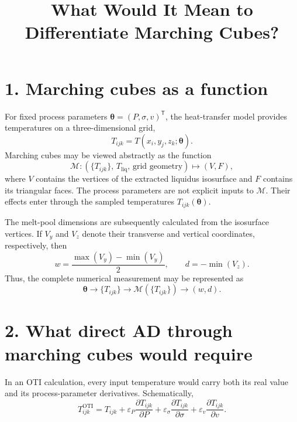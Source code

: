 \documentclass[12pt]{article}
\title{What Would It Mean to Differentiate Marching Cubes?}
\author{}
\date{}
\begin{document}
\maketitle

\section*{1. Marching cubes as a function}

For fixed process parameters
$\boldsymbol{\theta}=(P,\sigma,v)^{\mathsf T}$, the heat-transfer model
provides temperatures on a three-dimensional grid,
\begin{equation}
  T_{ijk}=T(x_i,y_j,z_k;\boldsymbol{\theta}).
\end{equation}
Marching cubes may be viewed abstractly as the function
\begin{equation}
  \mathcal M:
  \left(
    \{T_{ijk}\},\,T_{\mathrm{liq}},\,\text{grid geometry}
  \right)
  \longmapsto
  (V,F),
  \label{eq:marching-cubes-map}
\end{equation}
where $V$ contains the vertices of the extracted liquidus isosurface and
$F$ contains its triangular faces. The process parameters are not explicit
inputs to $\mathcal M$. Their effects enter through the sampled temperatures
$T_{ijk}(\boldsymbol{\theta})$.

The melt-pool dimensions are subsequently calculated from the isosurface
vertices. If $V_y$ and $V_z$ denote their transverse and vertical
coordinates, respectively, then
\begin{equation}
  w=\frac{\max(V_y)-\min(V_y)}{2},
  \qquad
  d=-\min(V_z).
  \label{eq:mesh-dimensions}
\end{equation}
Thus, the complete numerical measurement may be represented as
\begin{equation}
  \boldsymbol{\theta}
  \longrightarrow
  \{T_{ijk}\}
  \longrightarrow
  \mathcal M(\{T_{ijk}\})
  \longrightarrow
  (w,d).
  \label{eq:measurement-chain}
\end{equation}

\section*{2. What direct AD through marching cubes would require}

In an OTI calculation, every input temperature would carry both its real
value and its process-parameter derivatives. Schematically,
\begin{equation}
  T_{ijk}^{\mathrm{OTI}}
  =
  T_{ijk}
  +\varepsilon_P\frac{\partial T_{ijk}}{\partial P}
  +\varepsilon_\sigma\frac{\partial T_{ijk}}{\partial\sigma}
  +\varepsilon_v\frac{\partial T_{ijk}}{\partial v}.
  \label{eq:oti-temperature}
\end{equation}
\end{document}

